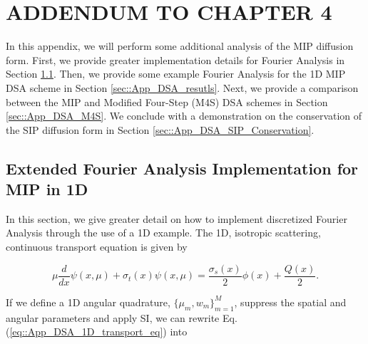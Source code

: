 %
%
%


\chapter{\uppercase {Addendum to Chapter 4}}
\label{sec::appendix_DSA}

In this appendix, we will perform some additional analysis of the MIP diffusion form. First, we provide greater implementation details for Fourier Analysis in Section \ref{sec::App_DSA_fourier}. Then, we provide some example Fourier Analysis for the 1D MIP DSA scheme in Section \ref{sec::App_DSA_resutls}. Next, we provide a comparison between the MIP and Modified Four-Step (M4S) DSA schemes in Section \ref{sec::App_DSA_M4S}. We conclude with a demonstration on the conservation of the SIP diffusion form in Section \ref{sec::App_DSA_SIP_Conservation}.

\section{Extended Fourier Analysis Implementation for MIP in 1D}
\label{sec::App_DSA_fourier}

In this section, we give greater detail on how to implement discretized Fourier Analysis through the use of a 1D example. The 1D, isotropic scattering, continuous transport equation is given by

\begin{equation}
\label{eq::App_DSA_1D_transport_eq}
\mu \frac{d }{d x} \psi (x,\mu) + \sigma_t (x) \psi(x,\mu) = \frac{\sigma_s (x)}{2} \phi(x) + \frac{Q(x)}{2}.
\end{equation}

\noindent If we define a 1D angular quadrature, $\{  \mu_m, w_m \}_{m=1}^M$, suppress the spatial and angular parameters and apply SI, we can rewrite Eq. (\ref{eq::App_DSA_1D_transport_eq}) into

